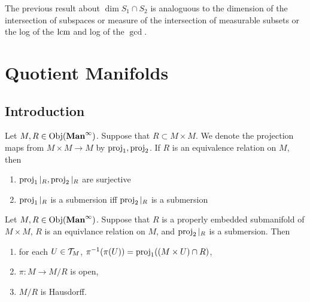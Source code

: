 \documentclass{book}
\begin{document}
	\begin{note}
		The previous result about $\dim S_1 \cap S_2$ is analoguous to the dimension of the intersection of subspaces or measure of the intersection of measurable subsets or the log of the $\text{lcm}$ and log of the $\gcd$.
	\end{note}
	
	
	
	
	
	
	
	
	
	
	
	
	
	
	
	
	
	
	
	
	
	
	
	
	
	
	
	
	
	
	
	
	
	
	\newpage
	\chapter{Quotient Manifolds}
	
	\section{Introduction}
	
	\begin{note}
		Let $M, R \in \operatorname{Obj}(\operatorname*{\text{\textbf{Man}}^{\infty}})$. Suppose that $R \subset M \times M$. We denote the projection maps from $M \times M \rightarrow M$ by $\operatorname{\text{proj}}_1, \operatorname{\text{proj}}_2$. If $R$ is an equivalence relation on $M$, then 
		\begin{enumerate}
			\item $\operatorname{\text{proj}}_1|_R, \operatorname{\text{proj}}_2|_R$ are surjective
			\item $\operatorname{\text{proj}}_1|_R$ is a submersion iff $\operatorname{\text{proj}}_2|_R$ is a submersion
		\end{enumerate}
	\end{note}
	
	
	\begin{ex}
		Let $M, R \in \operatorname{Obj}(\operatorname*{\text{\textbf{Man}}^{\infty}})$. Suppose that $R$ is a properly embedded submanifold of $M \times M$, $R$ is an equivlance relation on $M$, and $\operatorname{\text{proj}}_2|_R$ is a submersion. Then 
		\begin{enumerate}
			\item for each $U \in \mathcal{T}_M$, $\pi^{-1}(\pi(U)) = \operatorname{\text{proj}}_1((M \times U) \cap R)$,
			\item $\pi:M \rightarrow M /R$ is open,
			\item $M / R$ is Hausdorff.
		\end{enumerate}
	\end{ex}
\end{document}
